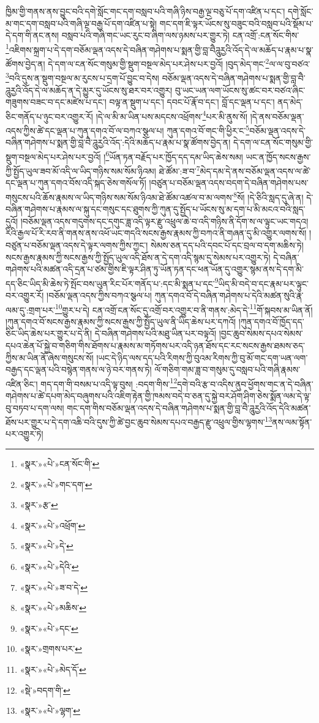 ཁྱིམ་གྱི་གནས་ནས་བྱུང་བའི་དགེ་སློང་གང་དག་བསླབ་པའི་གཞི་ཉིས་བརྒྱ་ལྔ་བཅུ་པོ་དག་འཛིན་པ་དང་། དགེ་སློང་མ་གང་དག་བསླབ་པའི་གཞི་ལྔ་བརྒྱ་པོ་དག་འཛིན་པ་སྟེ། གང་དག་ཇི་ལྟར་ཡོངས་སུ་བཟུང་བའི་བསླབ་པའི་སྡོམ་པ་དེ་དག་གི་ནང་ནས། བསླབ་པའི་གཞི་གང་ཡང་རུང་བ་ཞིག་ལས་ཉམས་པར་གྱུར་ཏེ། ངན་འགྲོ་:ངན་སོང་གིས་\footnote{«སྣར་»«པེ་»ངན་སོང་གི་}འཇིགས་སྐྲག་པ་དེ་དག་བཅོམ་ལྡན་འདས་དེ་བཞིན་གཤེགས་པ་སྨན་གྱི་བླ་བཻཌཱུརྱའི་འོད་དེ་ལ་མཆོད་པ་རྣམ་པ་སྣ་ཚོགས་བྱེད་ན། དེ་དག་ལ་ངན་སོང་གསུམ་གྱི་སྡུག་བསྔལ་མེད་པར་ཤེས་པར་བྱའོ། །བུད་མེད་གང་\footnote{«སྣར་»«པེ་»གང་དག་}ལ་ལ་བུ་བཙའ་\footnote{«སྣར་»རྩ་}བའི་དུས་ན་སྡུག་བསྔལ་མ་རུངས་པ་དྲག་པོ་བྱུང་བ་དེས། བཅོམ་ལྡན་འདས་དེ་བཞིན་གཤེགས་པ་སྨན་གྱི་བླ་བཻ་ཌཱུརྱའི་འོད་དེ་ལ་མཆོད་ན་དེ་མྱུར་དུ་ཡོངས་སུ་ཐར་བར་འགྱུར། བུ་ཡང་ཡན་ལག་ཡོངས་སུ་ཚང་བར་བཙའ་ཞིང་གཟུགས་བཟང་བ་དང་མཛེས་པ་དང་། བལྟ་ན་སྡུག་པ་དང་། དབང་པོ་རྣོ་བ་དང་། བློ་དང་ལྡན་པ་དང་། ནད་མེད་ཅིང་གནོད་པ་ཉུང་བར་འགྱུར་རོ། །དེ་ལ་མི་མ་ཡིན་པས་མདངས་འཕྲོགས་\footnote{«སྣར་»«པེ་»འཕྲོག་}པར་མི་ནུས་སོ། །དེ་ནས་བཅོམ་ལྡན་འདས་ཀྱིས་ཚེ་དང་ལྡན་པ་ཀུན་དགའ་བོ་ལ་བཀའ་སྩལ་པ། ཀུན་དགའ་བོ་གང་གི་ཕྱིར་ང་\footnote{«སྣར་»«པེ་»དེ་}བཅོམ་ལྡན་འདས་དེ་བཞིན་གཤེགས་པ་སྨན་གྱི་བླ་བཻ་ཌཱུརྱའི་འོད་:དེའི་མཆོད་པ་རྣམ་པ་སྣ་ཚོགས་བྱེད་ན། དེ་དག་ལ་ངན་སོང་གསུམ་གྱི་སྡུག་བསྔལ་མེད་པར་ཤེས་པར་བྱའོ། །\footnote{«སྣར་»«པེ་»དེའི་}ཡོན་ཏན་བརྗོད་པར་ཁྱོད་དད་དམ་ཡིད་ཆེས་སམ། ཡང་ན་ཁྱོད་སངས་རྒྱས་ཀྱི་སྤྱོད་ཡུལ་ཟབ་མོ་འདི་ལ་ཡིད་གཉིས་སམ་སོམ་ཉིའམ། ཐེ་ཚོམ་:ཟ་བ་\footnote{«སྣར་»«པེ་»ཟ་བ་དེ་}མེད་དམ་དེ་ནས་བཅོམ་ལྡན་འདས་ལ་ཚེ་དང་ལྡན་པ་ཀུན་དགའ་བོས་འདི་སྐད་ཅེས་གསོལ་ཏོ། །བཙུན་པ་བཅོམ་ལྡན་འདས་བདག་དེ་བཞིན་གཤེགས་པས་གསུངས་པའི་ཆོས་རྣམས་ལ་ཡིད་གཉིས་སམ་སོམ་ཉིའམ་ཐེ་ཚོམ་འཚལ་བ་མ་ལགས་\footnote{«སྣར་»«པེ་»མཆིས་}སོ། །དེ་ཅིའི་སླད་དུ་ཞེ་ན། དེ་བཞིན་གཤེགས་པ་རྣམས་ལ་སྐུ་དང་གསུང་དང་ཐུགས་ཀྱི་ཀུན་དུ་སྤྱོད་པ་ཡོངས་སུ་མ་དག་པ་མི་མངའ་བའི་སླད་དུའོ། །བཅོམ་ལྡན་འདས་གདུགས་དང་དགུང་ཟླ་འདི་ལྟར་རྫུ་འཕྲུལ་ཆེ་བ་འདི་གཉིས་ནི་དོག་ས་ལ་ལྟུང་ཡང་གདའ། རིའི་རྒྱལ་པོ་རི་རབ་ནི་གནས་ནས་འཕོ་ཡང་གདའི་སངས་རྒྱས་རྣམས་ཀྱི་བཀའ་ནི་གཞན་དུ་མི་འགྱུར་ལགས་སོ། །བཙུན་པ་བཅོམ་ལྡན་འདས་དེ་ལྟར་ལགས་ཀྱིས་ཀྱང་། སེམས་ཅན་དད་པའི་དབང་པོ་དང་བྲལ་བ་དག་མཆིས་ཏེ། སངས་རྒྱས་རྣམས་ཀྱི་སངས་རྒྱས་ཀྱི་སྤྱོད་ཡུལ་འདི་ཐོས་ན་དེ་དག་འདི་སྙམ་དུ་སེམས་པར་འགྱུར་ཏེ། དེ་བཞིན་གཤེགས་པའི་མཚན་འདི་དྲན་པ་ཙམ་གྱིས་ཇི་ལྟར་ཤིན་ཏུ་ཡོན་ཏན་དང་ཕན་ཡོན་དུ་འགྱུར་སྙམ་ནས་དེ་དག་མི་དད་ཅིང་ཡིད་མི་ཆེས་ཏེ་སྤོང་བས་ཡུན་རིང་པོར་གནོད་པ་:དང་མི་སྨན་པ་དང་\footnote{«སྣར་»«པེ་»དང་}ཡིད་མི་བདེ་བ་དང་རྣམ་པར་ལྟུང་བར་འགྱུར་རོ། །བཅོམ་ལྡན་འདས་ཀྱིས་བཀའ་སྩལ་པ། ཀུན་དགའ་བོ་དེ་བཞིན་གཤེགས་པ་དེའི་མཚན་སུའི་རྣ་ལམ་དུ་:གྲག་པར་\footnote{«སྣར་»གྲགས་པར་}གྱུར་པ་དེ། ངན་འགྲོ་ངན་སོང་དུ་འགྲོ་བར་འགྱུར་བ་ནི་གནས་:མེད་དེ་\footnote{«སྣར་»«པེ་»མེད་དོ་}གོ་སྐབས་མ་ཡིན་ནོ། །ཀུན་དགའ་བོ་སངས་རྒྱས་རྣམས་ཀྱི་སངས་རྒྱས་ཀྱི་སྤྱོད་ཡུལ་ནི་ཡིད་ཆེས་པར་དཀའོ། །ཀུན་དགའ་བོ་ཁྱོད་དད་ཅིང་ཡིད་ཆེས་པར་གྱུར་པ་དེ་ནི། དེ་བཞིན་གཤེགས་པའི་མཐུ་ཡིན་པར་བལྟའོ། །བྱང་ཆུབ་སེམས་དཔའ་སེམས་དཔའ་ཆེན་པོ་སྐྱེ་བ་གཅིག་གིས་ཐོགས་པ་རྣམས་མ་གཏོགས་པར་འདི་ཉན་ཐོས་དང་རང་སངས་རྒྱས་ཐམས་ཅད་ཀྱིས་མ་ཡིན་ནོ་ཞེས་གསུངས་སོ། །ཡང་དེ་ཉིད་ལས་དད་པའི་རིགས་ཀྱི་བུའམ་རིགས་ཀྱི་བུ་མོ་གང་དག་ཡན་ལག་བརྒྱད་དང་ལྡན་པའི་བསྙེན་གནས་ལ་ཉེ་བར་གནས་ཏེ། ལོ་གཅིག་གམ་ཟླ་བ་གསུམ་དུ་བསླབ་པའི་གཞི་རྣམས་འཛིན་ཅིང་། གད་དག་གི་བསམ་པ་འདི་ལྟ་བུས། :བདག་གིས་\footnote{«སྡེ་»བདག་གི་}དགེ་བའི་རྩ་བ་འདིས་ནུབ་ཕྱོགས་གང་ན་དེ་བཞིན་གཤེགས་པ་ཚེ་དཔག་མེད་བཞུགས་པའི་འཇིག་རྟེན་གྱི་ཁམས་བདེ་བ་ཅན་དུ་སྐྱེ་བར་ཤོག་ཤིག་ཅེས་སྨོན་ལམ་དེ་ལྟ་བུ་བཏབ་པ་དག་ལས། གང་དག་གིས་བཅོམ་ལྡན་འདས་དེ་བཞིན་གཤེགས་པ་སྨན་གྱི་བླ་བཻ་ཌཱུརྱའི་འོད་དེའི་མཚན་ཐོས་པར་གྱུར་པ་དེ་དག་འཆི་བའི་དུས་ཀྱི་ཚེ་བྱང་ཆུབ་སེམས་དཔའ་བརྒྱད་རྫུ་འཕྲུལ་གྱིས་ལྷགས་\footnote{«སྣར་»«པེ་»ལྷག་}ནས་ལམ་སྟོན་པར་འགྱུར་ཏེ། 